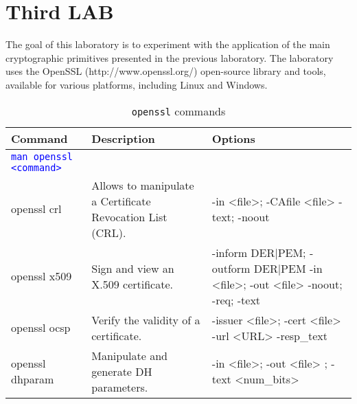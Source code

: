 \section{Third LAB}
\cite{LAB3}

The goal of this laboratory is to experiment with the application of the main cryptographic primitives presented in the previous laboratory. The laboratory uses the OpenSSL (http://www.openssl.org/) open-source library and tools, available for various platforms, including Linux and Windows.

\begin{table}[H]
	\centering
    \begin{tabular}{|p{6cm}|p{3cm}|p{7cm}|}\hline
        \rowcolor{gray!30}
		\textbf{Command} & \textbf{Description} & \textbf{Options} \\ \hline
		\textcolor{Blue}{\texttt{man openssl <command>}} 
			& 
			& 
        \\ \hline

        openssl crl
			& Allows to manipulate a Certificate Revocation List (CRL).
			& -in <file>; -CAfile <file> 
                \newline -text; -noout
        \\ \hline

        openssl x509
            & Sign and view an X.509 certificate.
            & -inform DER|PEM; -outform DER|PEM
                \newline -in <file>; -out <file>
                \newline -noout; -req; -text
        \\ \hline

        openssl ocsp
            & Verify the validity of a certificate.
            & -issuer <file>; -cert <file>
                \newline -url <URL>
                \newline -resp\_text
        \\ \hline

        openssl dhparam
            & Manipulate and generate DH parameters.
            & -in <file>; -out <file>
                \newline -2; -text
                \newline <num\_bits>
        \\ \hline


    \end{tabular}

    \caption{\texttt{openssl} commands}

\end{table}


